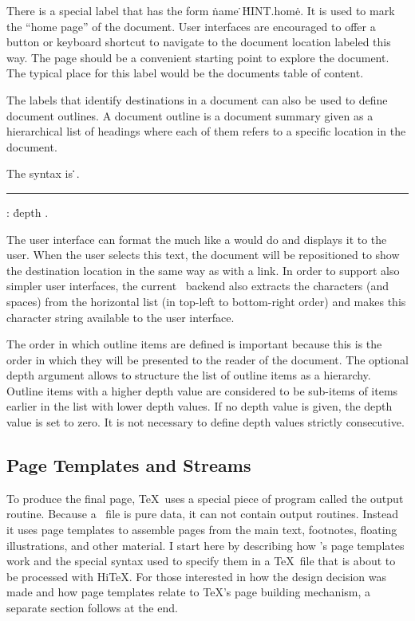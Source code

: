 There is a special label that has the form
\.{name} \.{\LB}\.{HINT.home}\.{\RB}.
It is used to mark the ``home page'' of the document. User interfaces
are encouraged to offer a button or keyboard shortcut to navigate to the
document location labeled this way. The page should be a convenient
starting point to explore the document. The typical place for this label
would be the documents table of content.

The labels that identify destinations in a document can also be used
to define document outlines. A document outline is a document summary
given as a hierarchical list of headings where each of them
refers to a specific location in the document.

The syntax is
  \.{\LB}\.{\RB}.

\medskip
\rule {}: \.{depth} .
\medskip

The user interface can format the  much like 
a  would do and displays it to the user. When the user selects
this text, the document will be repositioned to show the destination location
in the same way as with a link. In order to support also simpler
user interfaces, the current \HINT\ backend also extracts the characters
(and spaces) from the horizontal list (in top-left to bottom-right order)
and makes this character string available to the user interface.


The order in which outline items are defined is important because
this is the order in which they will be presented to the reader of the
document. The optional depth argument allows to structure 
the list of outline items as a hierarchy. Outline items with a higher depth value are considered to be sub-items of items earlier in the list with lower
depth values. If no depth value is given, the depth value is set to zero.
It is not necessary to define depth values strictly consecutive.


\subsection{Page Templates and Streams}

To produce the final page, \TeX\ uses a special piece of program
called the output routine.  Because a \HINT\
file is pure data, it can not contain output routines.  Instead it
uses page templates to assemble pages from the main text, footnotes,
floating illustrations, and other material.  I start here by
describing how \HINT's page templates work and the special syntax used
to specify them in a \TeX\ file that is about to be processed with
Hi\TeX.  For those interested in how the design decision was made and
how page templates relate to \TeX's page building mechanism, a
separate section follows at the end.

